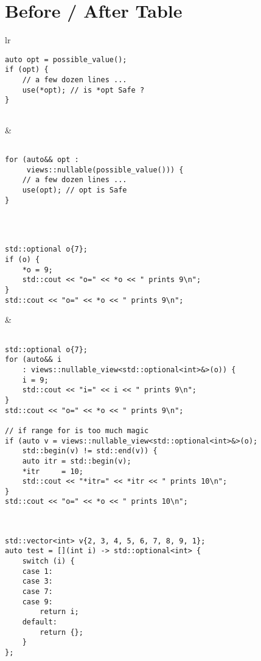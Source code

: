 \documentclass[a4paper,10pt,oneside,openany,final,article]{memoir}
\begin{document}
\chapter{Before / After Table}
\begin{tabular}{ lr }
\begin{minipage}[t]{0.45\columnwidth}
  \begin{verbatim}
auto opt = possible_value();
if (opt) {
    // a few dozen lines ...
    use(*opt); // is *opt Safe ?
}


\end{verbatim}
\end{minipage}
&
\begin{minipage}[t]{0.45\columnwidth}
\begin{verbatim}

for (auto&& opt :
     views::nullable(possible_value())) {
    // a few dozen lines ...
    use(opt); // opt is Safe
}

\end{verbatim}
\end{minipage}
\\ \midrule
\begin{minipage}[t]{0.45\columnwidth}
  \begin{verbatim}

std::optional o{7};
if (o) {
    *o = 9;
    std::cout << "o=" << *o << " prints 9\n";
}
std::cout << "o=" << *o << " prints 9\n";

\end{verbatim}
\end{minipage}
&
\begin{minipage}[t]{0.45\columnwidth}
\begin{verbatim}

std::optional o{7};
for (auto&& i
    : views::nullable_view<std::optional<int>&>(o)) {
    i = 9;
    std::cout << "i=" << i << " prints 9\n";
}
std::cout << "o=" << *o << " prints 9\n";

// if range for is too much magic
if (auto v = views::nullable_view<std::optional<int>&>(o);
    std::begin(v) != std::end(v)) {
    auto itr = std::begin(v);
    *itr     = 10;
    std::cout << "*itr=" << *itr << " prints 10\n";
}
std::cout << "o=" << *o << " prints 10\n";

\end{verbatim}
\end{minipage}
\\ \midrule
\begin{minipage}[t]{0.45\columnwidth}
\begin{verbatim}
std::vector<int> v{2, 3, 4, 5, 6, 7, 8, 9, 1};
auto test = [](int i) -> std::optional<int> {
    switch (i) {
    case 1:
    case 3:
    case 7:
    case 9:
        return i;
    default:
        return {};
    }
};


\end{verbatim}
\end{minipage}
\end{tabular}
\end{document}
